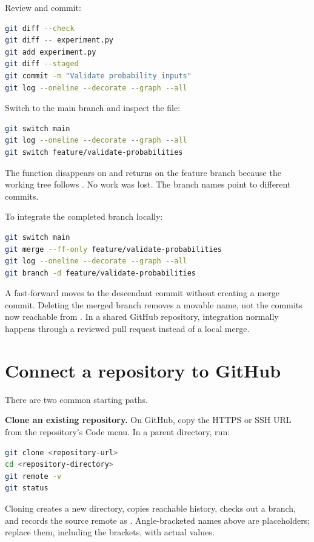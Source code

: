 Review and commit:

\begin{lstlisting}[language=bash,numbers=none]
git diff --check
git diff -- experiment.py
git add experiment.py
git diff --staged
git commit -m "Validate probability inputs"
git log --oneline --decorate --graph --all
\end{lstlisting}

Switch to the main branch and inspect the file:

\begin{lstlisting}[language=bash,numbers=none]
git switch main
git log --oneline --decorate --graph --all
git switch feature/validate-probabilities
\end{lstlisting}

The function disappears on  and returns on the feature branch because
the working tree follows . No work was lost. The branch names point
to different commits.

To integrate the completed branch locally:

\begin{lstlisting}[language=bash,numbers=none]
git switch main
git merge --ff-only feature/validate-probabilities
git log --oneline --decorate --graph --all
git branch -d feature/validate-probabilities
\end{lstlisting}

A fast-forward moves  to the descendant commit without creating a
merge commit. Deleting the merged branch removes a movable name, not the commits
now reachable from . In a shared GitHub repository, integration
normally happens through a reviewed pull request instead of a local merge.

\section{Connect a repository to GitHub}

There are two common starting paths.

\textbf{Clone an existing repository.} On GitHub, copy the HTTPS or SSH URL from
the repository's Code menu. In a parent directory, run:

\begin{lstlisting}[language=bash,numbers=none]
git clone <repository-url>
cd <repository-directory>
git remote -v
git status
\end{lstlisting}

Cloning creates a new directory, copies reachable history, checks out a branch,
and records the source remote as . Angle-bracketed names above are
placeholders; replace them, including the brackets, with actual values.

